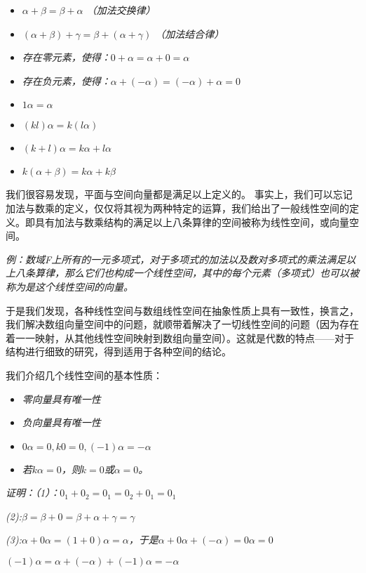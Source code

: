 \documentclass[a4paper]{ctexart}
\begin{document}
\begin{itemize}
\item \textit{$\alpha+\beta=\beta+\alpha$ （加法交换律）}
\item \textit{$(\alpha+\beta)+\gamma=\beta+(\alpha+\gamma)$ （加法结合律）}
\item \textit{存在零元素，使得：$0+\alpha=\alpha+0=\alpha$}
\item \textit{存在负元素，使得：$\alpha + (-\alpha)=(-\alpha)+\alpha=0$}
\item \textit{$1\alpha=\alpha$}
\item \textit{$(kl)\alpha=k(l\alpha)$}
\item \textit{$(k+l)\alpha=k\alpha+l\alpha$}
\item \textit{$k(\alpha +\beta)=k\alpha +k\beta$}
\end{itemize}

我们很容易发现，平面与空间向量都是满足以上定义的。
事实上，我们可以忘记加法与数乘的定义，仅仅将其视为两种特定的运算，我们给出了一般线性空间的定义。即具有加法与数乘结构的满足以上八条算律的空间被称为线性空间，或向量空间。

\textit{例：数域F上所有的一元多项式，对于多项式的加法以及数对多项式的乘法满足以上八条算律，那么它们也构成一个线性空间，其中的每个元素（多项式）也可以被称为是这个线性空间的向量。}

于是我们发现，各种线性空间与数组线性空间在抽象性质上具有一致性，换言之，我们解决数组向量空间中的问题，就顺带着解决了一切线性空间的问题（因为存在着一一映射，从其他线性空间映射到数组向量空间）。这就是代数的特点——对于结构进行细致的研究，得到适用于各种空间的结论。

我们介绍几个线性空间的基本性质：

\begin{itemize}
\item \textit{零向量具有唯一性}
\item \textit{负向量具有唯一性}
\item \textit{$0\alpha=0,k 0=0, (-1)\alpha=-\alpha$}
\item \textit{若$k\alpha=0$，则$k=0$或$\alpha=0$。}
\end{itemize}

\textit{证明：（1）：$0_1+0_2=0_1=0_2+0_1=0_1$}

\textit{(2):$\beta =\beta+0=\beta +\alpha +\gamma=\gamma$}

\textit{(3):$\alpha+0\alpha=(1+0)\alpha=\alpha$，于是$\alpha+0\alpha+(-\alpha)=0\alpha=0$}

\textit{$(-1)\alpha=\alpha+(-\alpha)+(-1)\alpha=-\alpha$}
\end{document}
